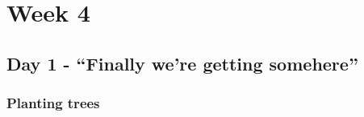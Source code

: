 \cleardoublepage
\chapter{Week 4}
\section{Day 1 - ``Finally we're getting somehere''}
\subsection{Planting trees}
